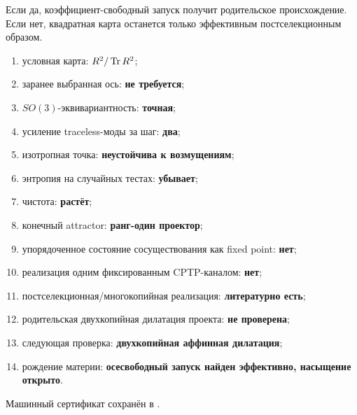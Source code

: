 Если да, коэффициент-свободный запуск получит родительское происхождение.
Если нет, квадратная карта останется только эффективным постселекционным
образом.

\begin{protocol}
\begin{enumerate}
 \item условная карта: \textbf{$R^2/\operatorname{Tr} R^2$};
 \item заранее выбранная ось: \textbf{не требуется};
 \item $SO(3)$-эквивариантность: \textbf{точная};
 \item усиление traceless-моды за шаг: \textbf{два};
 \item изотропная точка: \textbf{неустойчива к возмущениям};
 \item энтропия на случайных тестах: \textbf{убывает};
 \item чистота: \textbf{растёт};
 \item конечный attractor: \textbf{ранг-один проектор};
 \item упорядоченное состояние сосуществования как fixed point: \textbf{нет};
 \item реализация одним фиксированным CPTP-каналом: \textbf{нет};
 \item постселекционная/многокопийная реализация: \textbf{литературно есть};
 \item родительская двухкопийная дилатация проекта: \textbf{не проверена};
 \item следующая проверка: \textbf{двухкопийная аффинная дилатация};
 \item рождение материи:
 \textbf{осесвободный запуск найден эффективно, насыщение открыто}.
\end{enumerate}
\end{protocol}

Машинный сертификат сохранён в
.